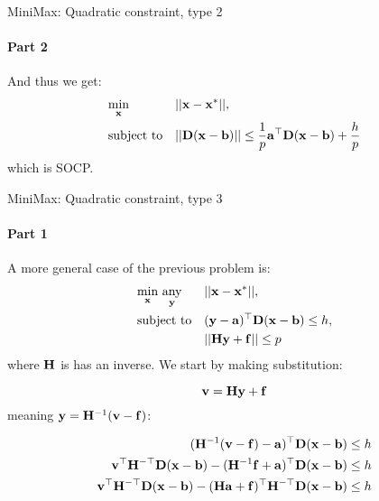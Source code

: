 \documentclass{beamer}
\begin{document}
\begin{frame}{MiniMax: Quadratic constraint, type 2}
\framesubtitle{Part 2}
\begin{flushleft}

And thus we get:
%
\begin{equation}
\begin{aligned}
& \underset{\mathbf{x}}{\text{min}}
& & ||\mathbf{x} - \mathbf{x}^*||, \\
& \text{subject to}
& & || \mathbf{D} (\mathbf{x} - \mathbf{b}) ||  \leq \frac{1}{p}\mathbf{a}^\top \mathbf{D} (\mathbf{x} - \mathbf{b}) + \frac{h}{p}
\end{aligned}
\end{equation}
%
which is SOCP. 
 
\end{flushleft}
\end{frame}






\begin{frame}{MiniMax: Quadratic constraint, type 3}
\framesubtitle{Part 1}
\begin{flushleft}

A more general case of the previous problem is:
%
\begin{equation}
\begin{aligned}
& \underset{\mathbf{x}}{\text{min}} \ \underset{\mathbf{y}}{\text{any}}
& & ||\mathbf{x} - \mathbf{x}^*||, \\
& \text{subject to}
& & (\mathbf{y} - \mathbf{a})^\top \mathbf{D} (\mathbf{x} - \mathbf{b}) \leq h, \\
& & & ||\mathbf{H}\mathbf{y} + \mathbf{f}|| \leq p
\end{aligned}
\end{equation}
%
where $\mathbf{H}$ is has an inverse. We start by making substitution:

\begin{equation}
    \mathbf{v} = \mathbf{H}\mathbf{y} + \mathbf{f}
\end{equation}
%
meaning $\mathbf{y} = \mathbf{H}^{-1}(\mathbf{v} -\mathbf{f})$:

\begin{align}
    (\mathbf{H}^{-1}(\mathbf{v} -\mathbf{f}) - \mathbf{a})^\top \mathbf{D} (\mathbf{x} - \mathbf{b}) \leq h \\
    \mathbf{v}^\top \mathbf{H}^{-\top} \mathbf{D} (\mathbf{x} - \mathbf{b}) - (\mathbf{H}^{-1}\mathbf{f} + \mathbf{a})^\top \mathbf{D} (\mathbf{x} - \mathbf{b}) \leq h\\
    \mathbf{v}^\top \mathbf{H}^{-\top} \mathbf{D} (\mathbf{x} - \mathbf{b}) - (\mathbf{H}\mathbf{a} + \mathbf{f})^\top \mathbf{H}^{-\top}\mathbf{D} (\mathbf{x} - \mathbf{b}) \leq h
\end{align}

 
\end{flushleft}
\end{frame}
\end{document}

